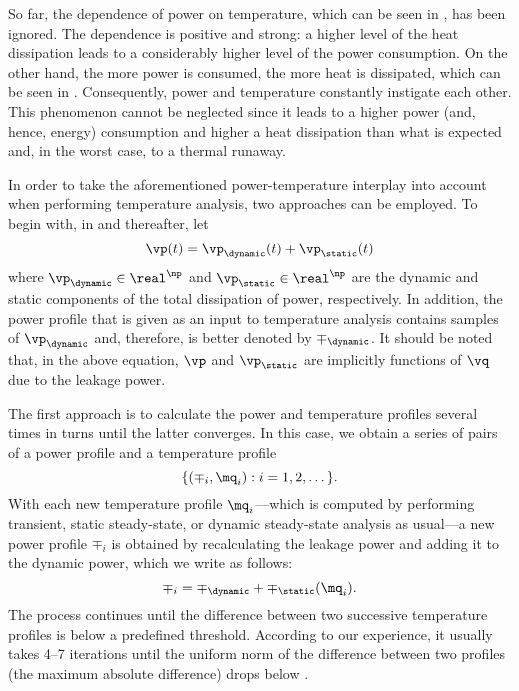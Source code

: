 So far, the dependence of power on temperature, which can be seen in
, has been ignored. The dependence is positive and strong: a
higher level of the heat dissipation leads to a considerably higher level of the
power consumption. On the other hand, the more power is consumed, the more heat
is dissipated, which can be seen in .
Consequently, power and temperature constantly instigate each other. This
phenomenon cannot be neglected since it leads to a higher power (and, hence,
energy) consumption and higher a heat dissipation than what is expected and, in
the worst case, to a thermal runaway.

In order to take the aforementioned power-temperature interplay into account
when performing temperature analysis, two approaches can be employed. To begin
with, in  and thereafter, let
\[
  \vp(t) = \vp_\dynamic(t) + \vp_\static(t)
\]
where $\vp_\dynamic \in \real^\np$ and $\vp_\static \in \real^\np$ are the
dynamic and static components of the total dissipation of power, respectively.
In addition, the power profile that is given as an input to temperature analysis
contains samples of $\vp_\dynamic$ and, therefore, is better denoted by
$\mp_\dynamic$. It should be noted that, in the above equation, $\vp$ and
$\vp_\static$ are implicitly functions of $\vq$ due to the leakage power.

The first approach is to calculate the power and temperature profiles several
times in turns until the latter converges. In this case, we obtain a series of
pairs of a power profile and a temperature profile
\[
  \{ (\mp_i, \mq_i): i = 1, 2, \dots \}.
\]
With each new temperature profile $\mq_i$---which is computed by performing
transient, static steady-state, or dynamic steady-state analysis as usual---a
new power profile $\mp_i$ is obtained by recalculating the leakage power and
adding it to the dynamic power, which we write as follows:
\[
  \mp_i = \mp_\dynamic + \mp_\static(\mq_i).
\]
The process continues until the difference between two successive temperature
profiles is below a predefined threshold. According to our experience, it
usually takes 4--7 iterations until the uniform norm of the difference between
two profiles (the maximum absolute difference) drops below .


